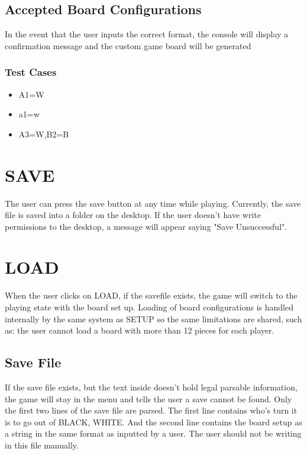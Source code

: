 \documentclass{article}
\begin{document}
\subsection{Accepted Board Configurations}
In the event that the user inputs the correct format, the console will display a confirmation message and the custom game board will be generated 

\subsubsection*{Test Cases}
\begin{itemize}
\item A1=W
\item a1=w
\item A3=W,B2=B
\end{itemize}

\section{SAVE}
The user can press the save button at any time while playing. Currently, the save file is saved into a folder on the desktop.
If the user doesn't have write permissions to the desktop, a message will appear saying "Save Unsuccessful".

\section{LOAD}
When the user clicks on LOAD, if the savefile exists, the game will switch to the playing state with the board set up.
Loading of board configurations is handled internally by the same system as SETUP so the same limitations are shared,
such as: the user cannot load a board with more than 12 pieces for each player.

\subsection{Save File}
If the save file exists, but the text inside doesn't hold legal parsable information, the game will stay in the menu and tells the user a save cannot be found.
Only the first two lines of the save file are parsed. The first line contains who's turn it is to go out of {BLACK, WHITE}.
And the second line contains the board setup as a string in the same format as inputted by a user.
The user should not be writing in this file manually.
\end{document}
